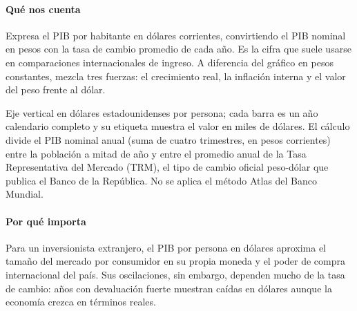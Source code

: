 \paragraph{Qué nos cuenta}
Expresa el PIB por habitante en dólares corrientes, convirtiendo el PIB nominal en pesos con la tasa de cambio promedio de cada año. Es la cifra que suele usarse en comparaciones internacionales de ingreso. A diferencia del gráfico en pesos constantes, mezcla tres fuerzas: el crecimiento real, la inflación interna y el valor del peso frente al dólar.

\begin{leer}
Eje vertical en dólares estadounidenses por persona; cada barra es un año calendario completo y su etiqueta muestra el valor en miles de dólares. El cálculo divide el PIB nominal anual (suma de cuatro trimestres, en pesos corrientes) entre la población a mitad de año y entre el promedio anual de la Tasa Representativa del Mercado (TRM), el tipo de cambio oficial peso-dólar que publica el Banco de la República. No se aplica el método Atlas del Banco Mundial.
\end{leer}

\paragraph{Por qué importa}
Para un inversionista extranjero, el PIB por persona en dólares aproxima el tamaño del mercado por consumidor en su propia moneda y el poder de compra internacional del país. Sus oscilaciones, sin embargo, dependen mucho de la tasa de cambio: años con devaluación fuerte muestran caídas en dólares aunque la economía crezca en términos reales.

